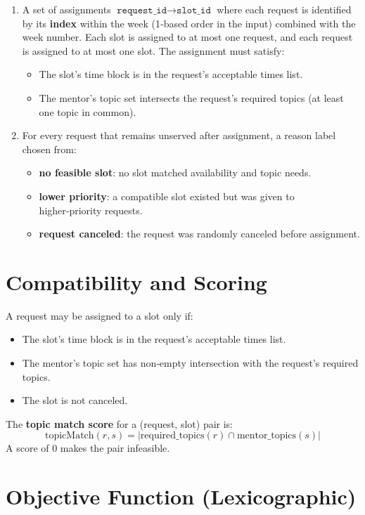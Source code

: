 \documentclass[12pt]{article}
\begin{document}
\begin{enumerate}
\item A set of assignments $\texttt{request\_id} \to \texttt{slot\_id}$ where each request is identified by its \textbf{index} within the week (1‑based order in the input) combined with the week number. Each slot is assigned to at most one request, and each request is assigned to at most one slot.  
The assignment must satisfy:
\begin{itemize}
\item The slot's time block is in the request's acceptable times list.
\item The mentor's topic set intersects the request's required topics (at least one topic in common).
\end{itemize}
\item For every request that remains unserved after assignment, a reason label chosen from:
\begin{itemize}
\item \textbf{no feasible slot}: no slot matched availability and topic needs.
\item \textbf{lower priority}: a compatible slot existed but was given to higher‑priority requests.
\item \textbf{request canceled}: the request was randomly canceled before assignment.
\end{itemize}
\end{enumerate}

\section*{Compatibility and Scoring}

A request may be assigned to a slot only if:
\begin{itemize}
\item The slot's time block is in the request's acceptable times list.
\item The mentor's topic set has non‑empty intersection with the request's required topics.
\item The slot is not canceled.
\end{itemize}

\noindent The \textbf{topic match score} for a (request, slot) pair is:
\[
\text{topicMatch}(r, s) = |\text{required\_topics}(r) \cap \text{mentor\_topics}(s)|
\]
A score of 0 makes the pair infeasible.

\section*{Objective Function (Lexicographic)}
\end{document}
